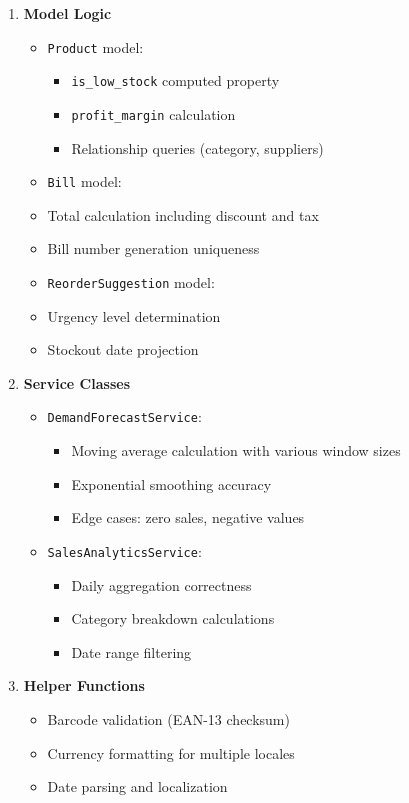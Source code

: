 \begin{enumerate}[leftmargin=*]
    \item \textbf{Model Logic}
    \begin{itemize}
        \item \texttt{Product} model:
        \begin{itemize}
            \item \texttt{is\_low\_stock} computed property
            \item \texttt{profit\_margin} calculation
            \item Relationship queries (category, suppliers)
        \end{itemize}
        \item \texttt{Bill} model:
        \item Total calculation including discount and tax
        \item Bill number generation uniqueness
        \item \texttt{ReorderSuggestion} model:
        \item Urgency level determination
        \item Stockout date projection
    \end{itemize}
    
    \item \textbf{Service Classes}
    \begin{itemize}
        \item \texttt{DemandForecastService}:
        \begin{itemize}
            \item Moving average calculation with various window sizes
            \item Exponential smoothing accuracy
            \item Edge cases: zero sales, negative values
        \end{itemize}
        \item \texttt{SalesAnalyticsService}:
        \begin{itemize}
            \item Daily aggregation correctness
            \item Category breakdown calculations
            \item Date range filtering
        \end{itemize}
    \end{itemize}
    
    \item \textbf{Helper Functions}
    \begin{itemize}
        \item Barcode validation (EAN-13 checksum)
        \item Currency formatting for multiple locales
        \item Date parsing and localization
    \end{itemize}
\end{enumerate}

